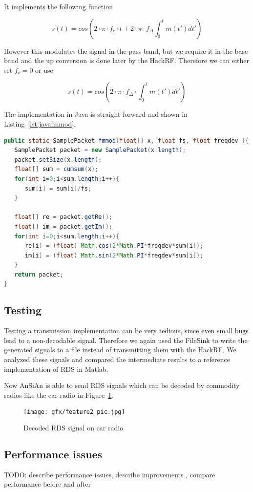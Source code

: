 It implements the following function 

\begin{equation}
 s(t) = cos\left(2\cdot \pi \cdot f_c \cdot t + 2\cdot \pi\cdot f_\Delta \int_{0}^{t}m(t')dt'\right)
\end{equation}

However this modulates the signal in the pass band, but we require it in the base band and the up conversion is done later by the HackRF. Therefore we can either set $f_c=0$ or use 

\begin{equation}
s(t) = cos\left(2\cdot \pi \cdot f_\Delta  \cdot \int_{0}^{t}m(t')dt'\right)
\end{equation}


The implementation in Java is straight forward and shown in Listing~\ref{lst:javafmmod}.
\begin{lstlisting}[label=lst:javafmmod, caption=Java Implementation of fmmod, language=java,]
public static SamplePacket fmmod(float[] x, float fs, float freqdev ){
   SamplePacket packet = new SamplePacket(x.length);
   packet.setSize(x.length);
   float[] sum = cumsum(x);
   for(int i=0;i<sum.length;i++){
      sum[i] = sum[i]/fs;
   }
	
   float[] re = packet.getRe();
   float[] im = packet.getIm();
   for(int i=0;i<sum.length;i++){
      re[i] = (float) Math.cos(2*Math.PI*freqdev*sum[i]);
      im[i] = (float) Math.sin(2*Math.PI*freqdev*sum[i]);
   }
   return packet;
}

\end{lstlisting}



\subsection{Testing} 
Testing a transmission implementation can be very tedious, since even small bugs lead to a non-decodable signal. Therefore we again used the FileSink to write the generated signals to a file instead of transmitting them with the HackRF. We analyzed these signals and compared the intermediate results to a reference implementation of RDS in Matlab. 

Now AnSiAn is able to send RDS signals which can be decoded by commodity radios like the car radio in Figure~\ref{fig:impl:picrds}.

\begin{figure}
	\centering
	\texttt{[image: gfx/feature2\_pic.jpg]}
	\caption{Decoded RDS signal on car radio}
	\label{fig:impl:picrds}
\end{figure}

\subsection{Performance issues}

TODO: describe performance issues, describe improvements , compare performance before and after 
